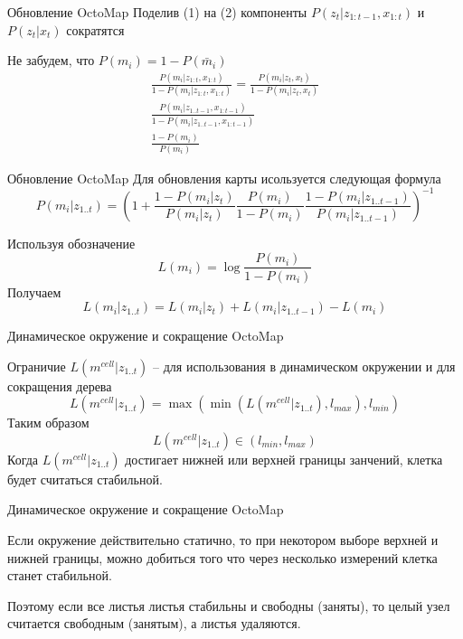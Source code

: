 \documentclass[9pt]{beamer}
\begin{document}
\begin{frame}{Обновление OctoMap}
Поделив (1) на (2) компоненты $P(z_t|z_{1:t-1}, x_{1:t})$ и $P(z_t|x_{t})$ сократятся

Не забудем, что $P(m_i) = 1 - P(\bar m_i)$
\begin{equation}
\begin{split}
\frac{P(m_i | z_{1:t}, x_{1:t})}{1 - P(m_i | z_{1:t}, x_{1:t})} = 
\frac{P(m_i | z_t, x_t)}{1- P(m_i | z_t, x_t)}\\
\frac{P(m_i | z_{1..t-1}, x_{1:t-1})}{1- P(m_i | z_{1..t-1}, x_{1:t-1})}\\
\frac{1 - P(m_i)}{P(m_{i})}
\end{split}
\end{equation}

\end{frame}


\begin{frame}{Обновление OctoMap}
  Для обновления карты исользуется следующая формула
  $$P(m_{i}| z_{1..t}) = \left(1 + \frac{1- P(m_i | z_{t})}{P(m_{i} | z_{t})}  \frac{P(m_{i})}{1 - P(m_i)} 
   \frac{1- P(m_i | z_{1..t-1})} {P(m_i | z_{1..t-1})}\right)^{-1}$$

  Используя обозначение 
  $$L(m_i)= \log{ \frac{P(m_i)}{1 - P(m_i)} }$$
  Получаем
  $$L(m_i| z_{1..t})= L(m_i | z_t) + L(m_i | z_{1..t-1}) - L(m_i)$$

\end{frame}

\begin{frame}{Динамическое окружение и сокращение OctoMap}

    Ограничие $L(m^{cell}| z_{1..t})$ -- для использования в динамическом окружении и для сокращения дерева
    $$L(m^{cell}| z_{1..t}) = \max( \min(L(m^{cell}| z_{1..t}), l_{max}), l_{min})$$
    Таким образом
    $$L(m^{cell}| z_{1..t}) \in (l_{min}, l_{max})$$
    Когда $L(m^{cell}| z_{1..t})$ достигает нижней или верхней границы занчений, клетка будет считаться стабильной.

\end{frame}

\begin{frame}{Динамическое окружение и сокращение OctoMap}

    Если окружение действительно статично, то при некотором выборе верхней и нижней границы, можно добиться того что через несколько измерений клетка станет стабильной. 

    Поэтому если все листья листья стабильны и свободны (заняты), то целый узел считается свободным (занятым), а листья удаляются.
    
\end{frame}
\end{document}
